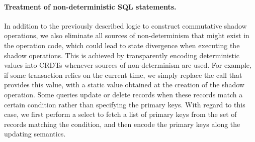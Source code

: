 \paragraph{Treatment of non-deterministic SQL statements.} 
In addition to the previously described logic to construct commutative shadow operations,
we also eliminate all sources of non-determinism that might exist in the operation code, which could lead to state divergence
when executing the shadow operations. This is achieved by transparently encoding deterministic
values into CRDTs whenever sources of non-determinism are used. For example, if some transaction relies
on the current time, we simply replace the call that provides this value, with a static value obtained
at the creation of the shadow operation. Some queries update or delete
records when these records match a certain condition rather than specifying the primary keys.
With regard to this case, we first perform a select to fetch a list of primary keys from the set of records matching the
condition, and then encode the primary keys along the updating semantics.



